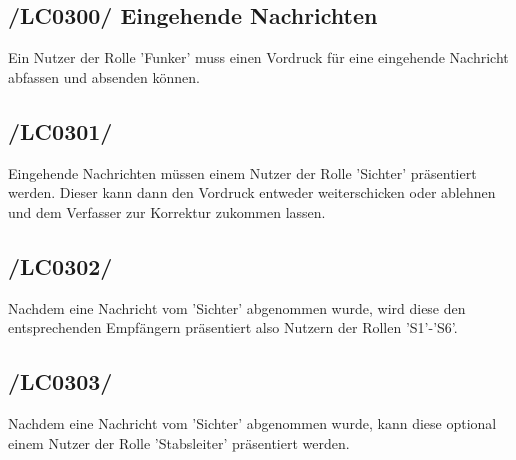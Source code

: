 \subsection{/LC0300/ Eingehende Nachrichten} 
Ein Nutzer der Rolle 'Funker' muss einen Vordruck für eine eingehende Nachricht abfassen und absenden können.

\subsection{/LC0301/}
Eingehende Nachrichten müssen einem Nutzer der Rolle 'Sichter' präsentiert werden. Dieser kann dann den Vordruck entweder weiterschicken oder ablehnen und dem Verfasser zur Korrektur zukommen lassen.

\subsection{/LC0302/}
Nachdem eine Nachricht vom 'Sichter' abgenommen wurde, wird diese den entsprechenden Empfängern präsentiert also Nutzern der Rollen 'S1'-'S6'.

\subsection{/LC0303/}
Nachdem eine Nachricht vom 'Sichter' abgenommen wurde, kann diese optional einem Nutzer der Rolle 'Stabsleiter' präsentiert werden.